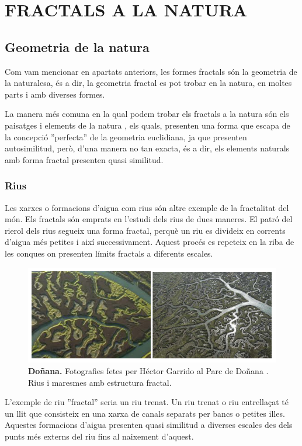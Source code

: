 \documentclass[12pt,a4paper]{report}
\begin{document}
\chapter{FRACTALS A LA NATURA}\label{fractals_nature}
\section{Geometria de la natura}
Com vam mencionar en apartats anteriors, les formes fractals són la geometria de la naturalesa, és a dir, la geometria fractal es pot trobar en la natura, en moltes parts i amb diverses formes.  

La manera més comuna en la qual podem trobar els fractals a la natura són els paisatges i elements de la natura \cite{FractalWorlds}, els quals, presenten una forma que escapa de la concepció ''perfecta'' de la geometria euclidiana, ja que presenten autosimilitud, però, d'una manera no tan exacta, és a dir, els elements naturals amb forma fractal presenten quasi similitud.
\subsection{Rius}
Les xarxes o formacions d'aigua com rius són altre exemple de la fractalitat del món. Els fractals són emprats en l'estudi dels rius de dues maneres.  El patró del rierol dels rius segueix una forma fractal, perquè un riu es divideix en corrents d'aigua més petites i així successivament. Aquest procés es repeteix en la riba de les conques on presenten límits fractals a diferents escales.
\begin{figure}[!ht]
\centering
\includegraphics[scale=1]{img/img04_dona.pdf}
\caption{\textbf{Doñana.} Fotografies fetes per Héctor Garrido al Parc de Doñana \cite{Miteco}. Rius i maresmes amb estructura fractal.}
\end{figure}

L'exemple de riu ''fractal'' seria un riu trenat. Un riu trenat o riu entrellaçat té un llit que consisteix en una xarxa de canals separats per bancs o petites illes. Aquestes formacions d'aigua presenten quasi similitud a diverses escales des dels punts més externs del riu fins al naixement d'aquest.
\end{document}

